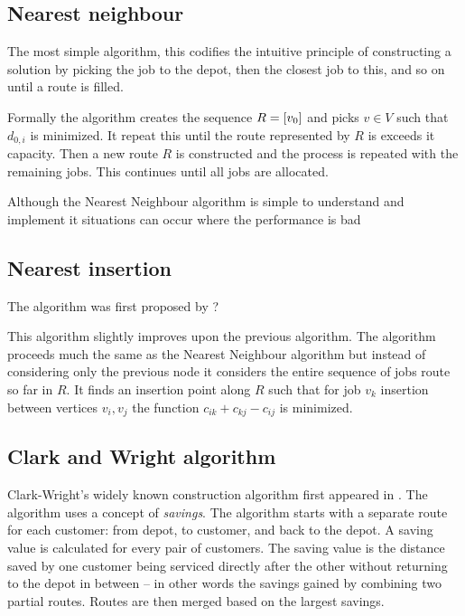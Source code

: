\subsection{Nearest neighbour}
The most simple algorithm, this codifies the intuitive principle of constructing a solution by picking the job to the depot, then the closest job to this, and so on until a route is filled.

Formally the algorithm creates the sequence $R = [v_0]$ and picks $v \in V$ such that $d_{0,i}$ is minimized. It repeat this until the route represented by $R$ is exceeds it capacity. Then a new route $R$ is constructed and the process is repeated with the remaining jobs. This continues until all jobs are allocated.

Although the Nearest Neighbour algorithm is simple to understand and implement it situations can occur where the performance is bad

\subsection{Nearest insertion}

The algorithm was first proposed by ?

This algorithm slightly improves upon the previous algorithm. The algorithm proceeds much the same as the Nearest Neighbour algorithm but instead of considering only the previous node it considers the entire sequence of jobs route so far in $R$. It finds an insertion point along $R$ such that for job $v_k$ insertion between vertices $v_i, v_j$ the function $c_{ik} + c_{kj} - c_{ij}$ is minimized.

\subsection{Clark and Wright algorithm}

Clark-Wright's widely known construction algorithm first appeared in \cite{clark:1964}. The algorithm uses a concept of \emph{savings}. The algorithm starts with a separate route for each customer: from depot, to customer, and back to the depot. A saving value is calculated for every pair of customers. The saving value is the distance saved by one customer being serviced directly after the other without returning to the depot in between -- in other words the savings gained by combining two partial routes. Routes are then merged based on the largest savings.

